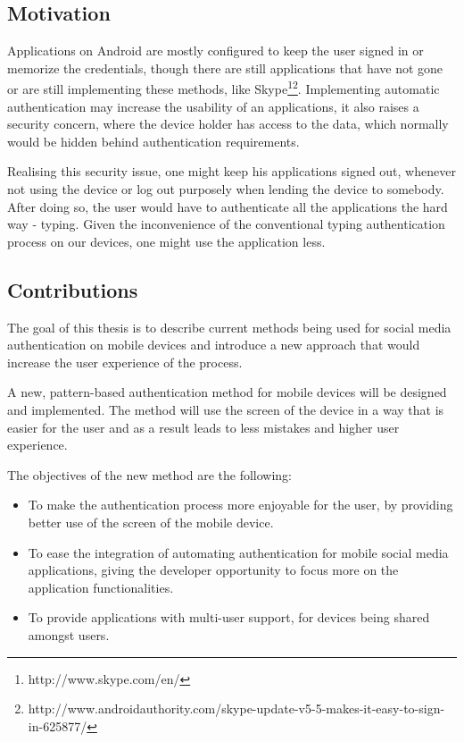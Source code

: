 \subsection{Motivation}
Applications on Android are mostly configured to keep the user signed in or memorize the credentials, though there are still applications that have not gone or are still implementing these methods, like Skype\footnote[1]{http://www.skype.com/en/}\footnote[2]{http://www.androidauthority.com/skype-update-v5-5-makes-it-easy-to-sign-in-625877/}. Implementing automatic authentication may increase the usability of an applications, it also raises a security concern, where the device holder has access to the data, which normally would be hidden behind authentication requirements.

Realising this security issue, one might keep his applications signed out, whenever not using the device or log out purposely when lending the device to somebody. After doing so, the user would have to authenticate all the applications the hard way - typing. Given the inconvenience of the conventional typing authentication process on our devices, one might use the application less.


\subsection{Contributions}

The goal of this thesis is to describe current methods being used for social media authentication on mobile devices and introduce a new approach that would increase the user experience of the process.

A new, pattern-based authentication method for mobile devices will be designed and implemented. The method will use the screen of the device in a way that is easier for the user and as a result leads to less mistakes and higher user experience.

The objectives of the new method are the following:
\begin{itemize}
  \item To make the authentication process more enjoyable for the user, by providing better use of the screen of the mobile device.
  \item To ease the integration of automating authentication for mobile social media applications, giving the developer opportunity to focus more on the application functionalities.
  \item To provide applications with multi-user support, for devices being shared amongst users. 
\end{itemize}

